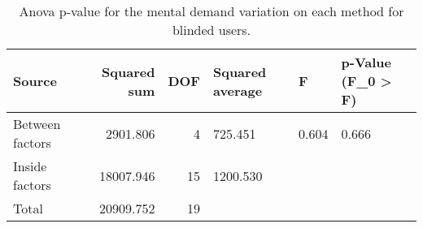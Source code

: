
\begin{table}[!htb]
\centering
\caption{Anova p-value for the mental demand variation on each method for blinded users.}
\label{tab:anova_mental_demand_var}
\begin{tabular}{lrrlll}
\toprule
         Source &  Squared sum &  DOF & Squared average &     F & p-Value (F\_0 > F) \\
\midrule
Between factors &     2901.806 &    4 &         725.451 & 0.604 &             0.666 \\
 Inside factors &    18007.946 &   15 &        1200.530 &       &                   \\
          Total &    20909.752 &   19 &                 &       &                   \\
\bottomrule
\end{tabular}
\end{table}

